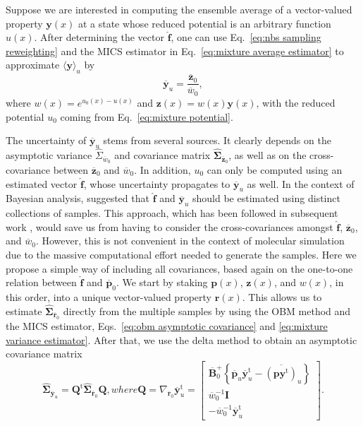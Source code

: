 \documentclass[journal=jctcce,manuscript=article,layout=twocolumn]{achemso}
\newcommand{\mt}[1]{\boldsymbol{\mathbf{#1}}}   %
\newcommand{\vt}[1]{\boldsymbol{\mathbf{#1}}}   %
\newcommand{\tr}[1]{#1^\text{t}}                %
\newcommand{\avg}[1]{\overline{#1}}             %
\begin{document}
Suppose we are interested in computing the ensemble average of a vector-valued property $\vt y(x)$ at a state whose reduced potential is an arbitrary function $u(x)$. After determining the vector $\hat{\vt f}$, one can use Eq.~\eqref{eq:nbs sampling reweighting} and the MICS estimator in Eq.~\eqref{eq:mixture average estimator} to approximate $\langle \vt y \rangle_u$ by
\begin{equation}
\label{eq:mics reweighting}
\avg{\vt y}_u = \frac{\avg{\vt z}_0}{\avg{w}_0},
\end{equation}
where $w(x) = e^{u_0(x) - u(x)}$ and ${\vt z}(x) = w(x) {\vt y}(x)$, with the reduced potential $u_0$ coming from Eq.~\eqref{eq:mixture potential}.

The uncertainty of $\avg{\vt y}_u$ stems from several sources. It clearly depends on the asymptotic variance $\hat \Sigma_{\avg w_0}$ and covariance matrix $\hat{\mt \Sigma}_{\avg{\vt z}_0}$, as well as on the cross-covariance between $\avg{\vt z}_0$ and $\avg w_0$. In addition, $u_0$ can only be computed using an estimated vector $\hat{\vt f}$, whose uncertainty propagates to $\avg{\vt y}_u$ as well. In the context of Bayesian analysis, \citeauthor{Buta_2011} \cite{Buta_2011} suggested that $\hat{\vt f}$ and $\avg{\vt y}_u$ should be estimated using distinct collections of samples. This approach, which has been followed in subsequent work \cite{Tan_2015, Roy_2018}, would save us from having to consider the cross-covariances amongst $\hat{\vt f}$, $\avg{\vt z}_0$, and $\avg w_0$. However, this is not convenient in the context of molecular simulation due to the massive computational effort needed to generate the samples. Here we propose a simple way of including all covariances, based again on the one-to-one relation between $\hat{\vt f}$ and $\avg{\vt p}_0$. We start by staking $\vt p(x)$, $\vt z(x)$, and $w(x)$, in this order, into a unique vector-valued property $\vt r(x)$. This allows us to estimate $\hat{\mt \Sigma}_{\avg{\vt r}_0}$ directly from the multiple samples by using the OBM method and the MICS estimator, Eqs.~\eqref{eq:obm asymptotic covariance} and \eqref{eq:mixture variance estimator}. After that, we use the delta method to obtain an asymptotic covariance matrix
\begin{subequations}
\label{eq:mics reweighting uncertainty}
\begin{equation}
\label{eq:mics reweighting delta method}
\hat{\mt \Sigma}_{\avg{\vt y}_u} = \tr{\mt Q} \hat{\mt \Sigma}_{\avg{\vt r}_0} {\mt Q},
\end{equation}
where
\begin{equation}
\label{eq:mics reweighting gradient}
{\mt Q} = \nabla_{\avg{\vt r}_0} \tr{\avg{\vt y}}_u = \left[\begin{array}{c}
\avg{\mt B}_0^+ \left\{ \avg{\vt p}_u \tr{\avg{\vt y}}_u - \avg{(\vt p \tr{\vt y})}_u\right\} \\
\avg{w}_0^{-1} {\mt I} \\
-\avg{w}_0^{-1} \tr{\avg{\vt y}}_u
\end{array}\right].
\end{equation}
\end{subequations}
\end{document}
